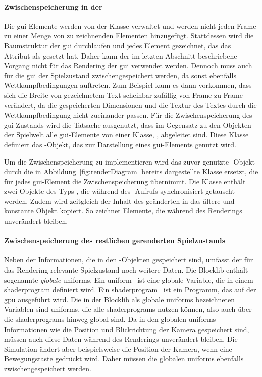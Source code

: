 \paragraph{Zwischenspeicherung in der }
Die \ac{gui}-Elemente werden von der Klasse  verwaltet und werden nicht jeden Frame zu einer Menge von zu zeichnenden Elementen hinzugefügt. 
Stattdessen wird die Baumstruktur der \ac{gui} durchlaufen und jedes Element gezeichnet, das das Attribut  als  gesetzt hat. Daher kann der im letzten Abschnitt beschriebene Vorgang nicht für das Rendering der \ac{gui} verwendet werden. Dennoch muss auch für die \ac{gui} der Spielzustand zwischengespeichert werden, da sonst ebenfalls Wettkampfbedingungen auftreten. Zum Beispiel kann es dann vorkommen, dass sich die Breite von gezeichnetem Text scheinbar zufällig von Frame zu Frame verändert, da die gespeicherten Dimensionen und die Textur des Textes durch die Wettkampfbedingung nicht zueinander passen. Für die Zwischenspeicherung des \ac{gui}-Zustands wird die Tatsache ausgenutzt, dass im Gegensatz zu den Objekten der Spielwelt alle \ac{gui}-Elemente von einer Klasse, , abgeleitet sind. Diese Klasse definiert das -Objekt, das zur Darstellung eines \ac{gui}-Elements genutzt wird. 

Um die Zwischenspeicherung zu implementieren wird das zuvor genutzte -Objekt durch die in Abbildung~\ref{fig:renderDiagram} bereits dargestellte Klasse  ersetzt, die für jedes \ac{gui}-Element die Zwischenspeicherung übernimmt. Die Klasse enthält zwei Objekte des Typs , die während des -Aufrufs synchronisiert getauscht werden. Zudem wird zeitgleich der Inhalt des geänderten  in das ältere und konstante Objekt kopiert. So zeichnet  Elemente, die während des Renderings unverändert bleiben.

\paragraph{Zwischenspeicherung des restlichen gerenderten Spielzustands} Neben der Informationen, die in den  -Objekten gespeichert sind, umfasst der für das Rendering relevante Spielzustand noch weitere Daten. 
Die Blocklib enthält sogenannte \emph{globale} \glspl{uniform}. Ein \gls{uniform}~\cite[S.~45~ff.]{Vries2020} ist eine globale Variable, die in einem \gls{shaderprogram} definiert wird. Ein \gls{shaderprogram}~\cite[S.~32~f.]{Vries2020} ist ein \gls{Programm}, das auf der \ac{gpu} ausgeführt wird. Die in der Blocklib als globale \glspl{uniform} bezeichneten Variablen sind \glspl{uniform}, die alle \glspl{shaderprogram} nutzen können, also auch über die \glspl{shaderprogram} hinweg global sind. Da in den globalen \glspl{uniform} Informationen wie die Position und Blickrichtung der Kamera gespeichert sind, müssen auch diese Daten während des Renderings unverändert bleiben. Die Simulation ändert aber beispielsweise die Position der Kamera, wenn eine Bewegungstaste gedrückt wird. Daher müssen die globalen \glspl{uniform} ebenfalls zwischengespeichert werden.

